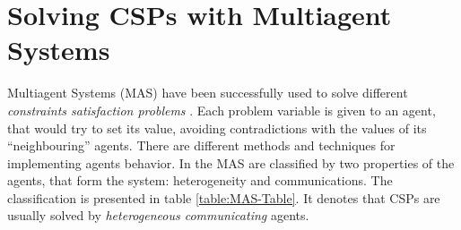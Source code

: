 \documentclass[../ThesisDoc]{subfiles}
\begin{document}
\providecommand{\rootdir}{..}



\section{Solving CSPs with Multiagent Systems}
\label{sec:CSP-Agents}

Multiagent Systems (MAS) have been successfully used to solve
different \emph{constraints satisfaction problems} \cite{MAS, MAS-Survey}.
Each problem variable is given to an agent, that would try to set its value,
avoiding contradictions with the values of its ``neighbouring'' agents.
There are different methods and techniques for implementing agents behavior.
In \cite{MAS-Survey} the MAS are classified by two properties of the agents,
that form the system: heterogeneity and communications.
The classification is presented in table \ref{table:MAS-Table}. It denotes
that CSPs are usually solved by \emph{heterogeneous communicating} agents.
\end{document}
